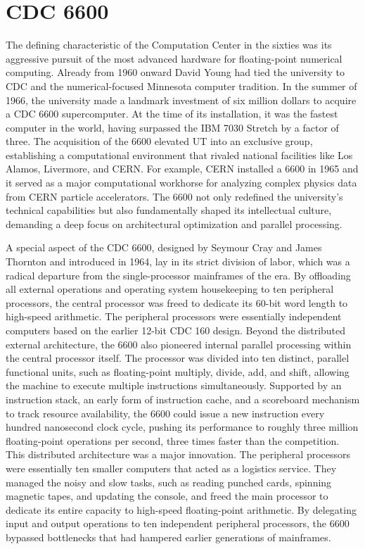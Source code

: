 \section{CDC 6600}

The defining characteristic of the Computation Center in the sixties was its aggressive pursuit of the most advanced hardware for floating-point numerical computing. Already from 1960 onward David Young had tied the university to CDC and the numerical-focused Minnesota computer tradition. In the summer of 1966, the university made a landmark investment of six million dollars to acquire a CDC 6600 supercomputer. At the time of its installation, it was the fastest computer in the world, having surpassed the IBM 7030 Stretch by a factor of three. The acquisition of the 6600 elevated UT into an exclusive group, establishing a computational environment that rivaled national facilities like Los Alamos, Livermore, and CERN. For example, CERN installed a 6600 in 1965 and it served as a major computational workhorse for analyzing complex physics data from CERN particle accelerators. The 6600 not only redefined the university's technical capabilities but also fundamentally shaped its intellectual culture, demanding a deep focus on architectural optimization and parallel processing.

A special aspect of the CDC 6600, designed by Seymour Cray and James Thornton and introduced in 1964, lay in its strict division of labor, which was a radical departure from the single-processor mainframes of the era. By offloading all external operations and operating system housekeeping to ten peripheral processors, the central processor was freed to dedicate its 60-bit word length to high-speed arithmetic. The peripheral processors were essentially independent computers based on the earlier 12-bit CDC 160 design. Beyond the distributed external architecture, the 6600 also pioneered internal parallel processing within the central processor itself. The processor was divided into ten distinct, parallel functional units, such as floating-point multiply, divide, add, and shift, allowing the machine to execute multiple instructions simultaneously. Supported by an instruction stack, an early form of instruction cache, and a scoreboard mechanism to track resource availability, the 6600 could issue a new instruction every hundred nanosecond clock cycle, pushing its performance to roughly three million floating-point operations per second, three times faster than the competition. This distributed architecture was a major innovation. The peripheral processors were essentially ten smaller computers that acted as a logistics service. They managed the noisy and slow tasks, such as reading punched cards, spinning magnetic tapes, and updating the console, and freed the main processor to dedicate its entire capacity to high-speed floating-point arithmetic. By delegating input and output operations to ten independent peripheral processors, the 6600 bypassed bottlenecks that had hampered earlier generations of mainframes.

